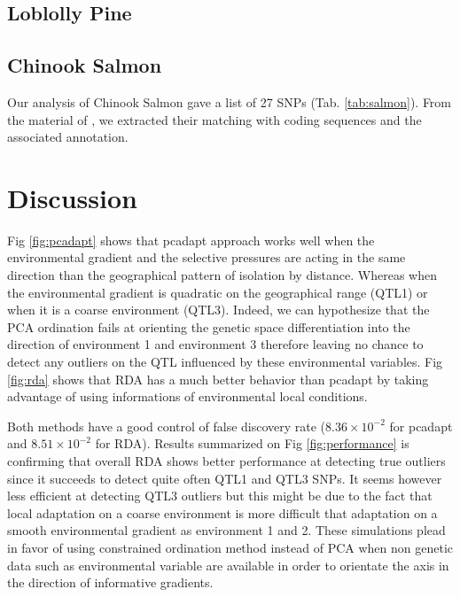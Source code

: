 \documentclass[nogrid]{MBE}%
\begin{document}
\subsection{Loblolly Pine}


\subsection{Chinook Salmon}

Our analysis of Chinook Salmon gave a list of 27 SNPs (Tab. \ref{tab:salmon}). From the material of \citet{Hecht2015}, we extracted their matching with coding sequences and the associated annotation. 


\section{Discussion}

Fig \ref{fig:pcadapt} shows that pcadapt approach works well when the environmental gradient and the selective pressures are acting in the same direction than the geographical pattern of isolation by distance. Whereas when the environmental gradient is quadratic on the geographical range (QTL1) or when it is a coarse environment (QTL3). Indeed, we can hypothesize that the PCA ordination fails at orienting the genetic space differentiation into the direction of environment 1 and environment 3 therefore leaving no chance to detect any outliers on the QTL influenced by these environmental variables. Fig \ref{fig:rda} shows that RDA has a much better behavior than pcadapt by taking advantage of using informations of environmental local conditions.

Both methods have a good control of false discovery rate ($8.36 \times 10^{-2}$ for pcadapt and $8.51 \times 10^{-2}$ for RDA). Results summarized on Fig \ref{fig:performance} is confirming that overall RDA shows better performance at detecting true outliers since it succeeds to detect quite often QTL1 and QTL3 SNPs. It seems however less efficient at detecting QTL3 outliers but this might be due to the fact that local adaptation on a coarse environment is more difficult  that adaptation on a smooth environmental gradient as environment 1 and 2. These simulations plead in favor of using constrained ordination method instead of PCA when non genetic data such as environmental variable are available in order to orientate the axis in the direction of informative gradients.
\end{document}
